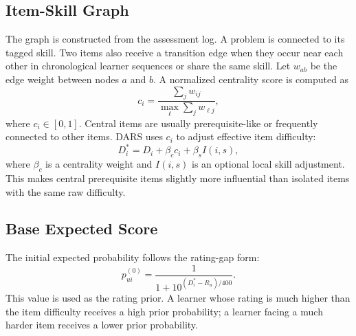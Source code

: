 \documentclass[conference]{IEEEtran}
\begin{document}
\subsection{Item-Skill Graph}
The graph is constructed from the assessment log. A problem is connected to its tagged skill. Two items also receive a transition edge when they occur near each other in chronological learner sequences or share the same skill. Let $w_{ab}$ be the edge weight between nodes $a$ and $b$. A normalized centrality score is computed as
\begin{equation}
c_i=\frac{\sum_j w_{ij}}{\max_{\ell}\sum_j w_{\ell j}},
\end{equation}
where $c_i\in[0,1]$. Central items are usually prerequisite-like or frequently connected to other items. DARS uses $c_i$ to adjust effective item difficulty:
\begin{equation}
D_i^\ast=D_i+\beta_c c_i+\beta_s I(i,s),
\end{equation}
where $\beta_c$ is a centrality weight and $I(i,s)$ is an optional local skill adjustment. This makes central prerequisite items slightly more influential than isolated items with the same raw difficulty.

\subsection{Base Expected Score}
The initial expected probability follows the rating-gap form:
\begin{equation}
p^{(0)}_{ui}=\frac{1}{1+10^{(D_i^\ast-R_u)/400}}.
\end{equation}
This value is used as the rating prior. A learner whose rating is much higher than the item difficulty receives a high prior probability; a learner facing a much harder item receives a lower prior probability.
\end{document}
